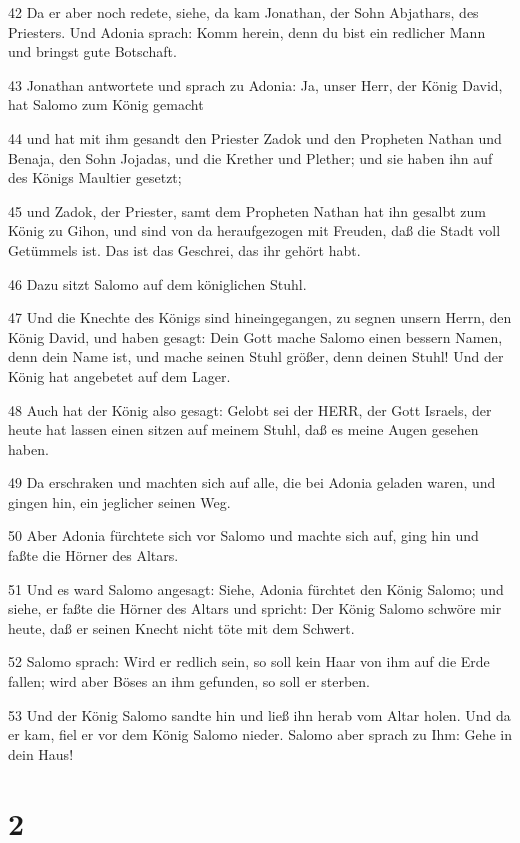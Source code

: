 \par 42 Da er aber noch redete, siehe, da kam Jonathan, der Sohn Abjathars, des Priesters. Und Adonia sprach: Komm herein, denn du bist ein redlicher Mann und bringst gute Botschaft.
\par 43 Jonathan antwortete und sprach zu Adonia: Ja, unser Herr, der König David, hat Salomo zum König gemacht
\par 44 und hat mit ihm gesandt den Priester Zadok und den Propheten Nathan und Benaja, den Sohn Jojadas, und die Krether und Plether; und sie haben ihn auf des Königs Maultier gesetzt;
\par 45 und Zadok, der Priester, samt dem Propheten Nathan hat ihn gesalbt zum König zu Gihon, und sind von da heraufgezogen mit Freuden, daß die Stadt voll Getümmels ist. Das ist das Geschrei, das ihr gehört habt.
\par 46 Dazu sitzt Salomo auf dem königlichen Stuhl.
\par 47 Und die Knechte des Königs sind hineingegangen, zu segnen unsern Herrn, den König David, und haben gesagt: Dein Gott mache Salomo einen bessern Namen, denn dein Name ist, und mache seinen Stuhl größer, denn deinen Stuhl! Und der König hat angebetet auf dem Lager.
\par 48 Auch hat der König also gesagt: Gelobt sei der HERR, der Gott Israels, der heute hat lassen einen sitzen auf meinem Stuhl, daß es meine Augen gesehen haben.
\par 49 Da erschraken und machten sich auf alle, die bei Adonia geladen waren, und gingen hin, ein jeglicher seinen Weg.
\par 50 Aber Adonia fürchtete sich vor Salomo und machte sich auf, ging hin und faßte die Hörner des Altars.
\par 51 Und es ward Salomo angesagt: Siehe, Adonia fürchtet den König Salomo; und siehe, er faßte die Hörner des Altars und spricht: Der König Salomo schwöre mir heute, daß er seinen Knecht nicht töte mit dem Schwert.
\par 52 Salomo sprach: Wird er redlich sein, so soll kein Haar von ihm auf die Erde fallen; wird aber Böses an ihm gefunden, so soll er sterben.
\par 53 Und der König Salomo sandte hin und ließ ihn herab vom Altar holen. Und da er kam, fiel er vor dem König Salomo nieder. Salomo aber sprach zu Ihm: Gehe in dein Haus!

\chapter{2}

